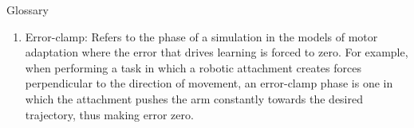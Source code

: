 \documentclass{report}
\begin{document}
\begin{chapter}{Glossary}
\begin{enumerate}
\item Error-clamp: Refers to the phase of a simulation in the models of motor
adaptation where the error that drives learning is forced to zero. For example,
when performing a task in which a robotic attachment creates forces perpendicular
to the direction of movement, an error-clamp phase is one in which the attachment
pushes the arm constantly towards the desired trajectory, thus making error zero.
\end{enumerate}
\end{chapter}

\end{document}
